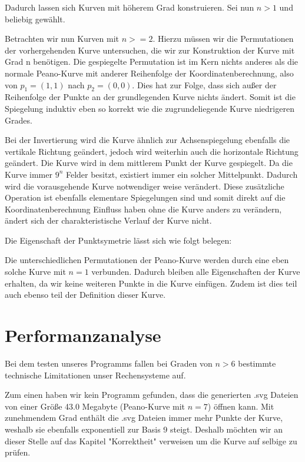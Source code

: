 \documentclass[course=asp]{aspdoc}
\begin{document}
Dadurch lassen sich Kurven mit höherem Grad konstruieren. Sei nun $n>1$ und beliebig gewählt.

Betrachten wir nun Kurven mit $n>=2$. Hierzu müssen wir die Permutationen der vorhergehenden Kurve untersuchen, die wir zur Konstruktion der Kurve mit Grad n benötigen.	%
Die gespiegelte Permutation ist im Kern nichts anderes als die normale Peano-Kurve mit anderer Reihenfolge der Koordinatenberechnung, also von $p_1=(1,1)$ nach $p_2 = (0,0)$. Dies hat zur Folge, dass sich außer der Reihenfolge der Punkte an der grundlegenden Kurve nichts ändert. Somit ist die Spiegelung induktiv eben so korrekt wie die zugrundeliegende Kurve niedrigeren Grades.

Bei der Invertierung wird die Kurve ähnlich zur Achsenspiegelung ebenfalls die vertikale Richtung geändert, jedoch wird weiterhin auch die horizontale Richtung geändert. Die Kurve wird in dem mittlerem Punkt der Kurve gespiegelt. Da die Kurve immer $9^n$ Felder besitzt, existiert immer ein solcher Mittelpunkt. Dadurch wird die vorausgehende Kurve notwendiger weise verändert.  Diese zusätzliche Operation ist ebenfalls elementare Spiegelungen sind und somit direkt auf die Koordinatenberechnung Einfluss haben ohne die Kurve anders zu verändern, ändert sich der charakteristische Verlauf der Kurve nicht.

Die Eigenschaft der Punktsymetrie lässt sich wie folgt belegen: 

Die unterschiedlichen Permutationen der Peano-Kurve werden durch eine eben solche Kurve mit $n = 1$ verbunden. Dadurch bleiben alle Eigenschaften der Kurve erhalten, da wir keine weiteren Punkte in die Kurve einfügen. Zudem ist dies teil auch ebenso teil der Definition dieser Kurve. 


\newpage
\section{Performanzanalyse}

Bei dem testen unseres Programms fallen bei Graden von $n > 6$ bestimmte technische Limitationen unser Rechensysteme auf. 

Zum einen haben wir kein Programm gefunden, dass die generierten .svg Dateien von einer Größe 43.0 Megabyte (Peano-Kurve mit $n = 7$) öffnen kann. Mit zunehmendem Grad enthält die .svg Dateien immer mehr Punkte der Kurve, weshalb sie ebenfalls exponentiell zur Basis 9 steigt. Deshalb möchten wir an dieser Stelle auf das Kapitel "Korrektheit" verweisen um die Kurve auf selbige zu prüfen.
\end{document}
